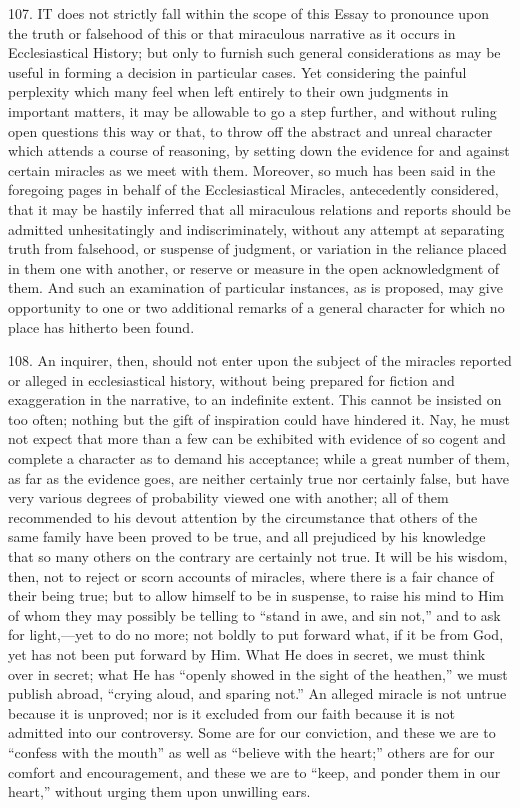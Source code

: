 107.
IT does not strictly fall within
the scope of this Essay to pronounce upon the truth or falsehood of
this or that miraculous narrative as it occurs in Ecclesiastical
History; but only to furnish such general considerations as may be
useful in forming a decision in particular cases. Yet considering the
painful perplexity which many feel when left entirely to their own
judgments in important matters, it may be allowable to go a step
further, and without ruling open questions this way or that, to throw
off the abstract and unreal character which attends a course of
reasoning, by setting down the evidence for and against certain
miracles as we meet with them. Moreover, so much has been said in the
foregoing pages in behalf of the Ecclesiastical Miracles, antecedently
considered, that it may be hastily inferred that all miraculous
relations and reports should be admitted unhesitatingly and
indiscriminately, without any attempt at separating truth from
falsehood, or suspense of judgment, or variation in the reliance
placed in them one with another, or reserve or measure in the open
acknowledgment of them. And such an examination of particular
instances, as is proposed, may give opportunity to one or two
additional remarks of a general character for which no place has
hitherto been found.

108.
An inquirer, then, should not enter upon the subject of the miracles
reported or alleged in ecclesiastical history, without being prepared
for fiction and exaggeration in the narrative, to an indefinite
extent. This cannot be insisted on too often; nothing but the gift of
inspiration could have hindered it. Nay, he must not expect that more than a few can be exhibited with
evidence of so cogent and complete a character as to demand his
acceptance; while a great number of them, as far as the evidence goes,
are neither certainly true nor certainly false, but have very various
degrees of probability viewed one with another; all of them
recommended to his devout attention by the circumstance that others of
the same family have been proved to be true, and all prejudiced by his
knowledge that so many others on the contrary are certainly not true.
It will be his wisdom, then, not to reject or scorn accounts of
miracles, where there is a fair chance of their being true; but to
allow himself to be in suspense, to raise his mind to Him of whom they
may possibly be telling to ``stand in awe, and sin not,'' and to
ask for light,—yet to do no more; not boldly to put forward what, if
it be from God, yet has not been put forward by Him. What He does in
secret, we must think over in secret; what He has ``openly showed in
the sight of the heathen,'' we must publish abroad, ``crying aloud, and
sparing not.'' An alleged miracle is not untrue because it is unproved;
nor is it excluded from our faith because it is not admitted into our
controversy. Some are for our conviction, and these we are to ``confess
with the mouth'' as well as ``believe with the heart;'' others are for
our comfort and encouragement, and these we are to ``keep, and ponder
them in our heart,'' without urging them upon unwilling ears.

